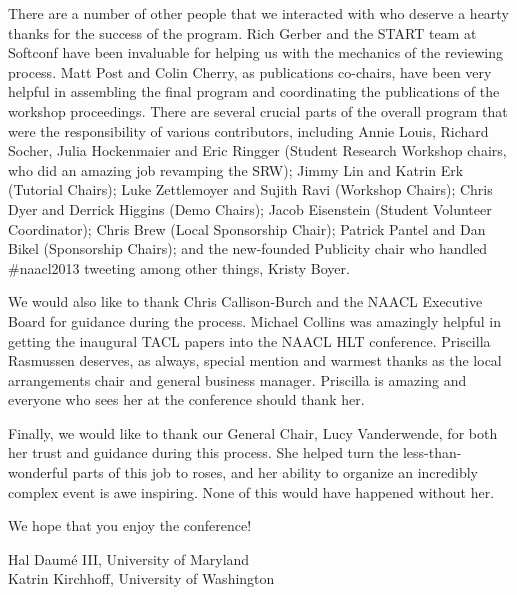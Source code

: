 There are a number of other people that we interacted with who deserve a hearty thanks for the success of the program. Rich Gerber and the START team at Softconf have been invaluable for helping us with the mechanics of the reviewing process. Matt Post and Colin Cherry, as publications co-chairs, have been very helpful in assembling the final program and coordinating the publications of the workshop proceedings. There are several crucial parts of the overall program that were the responsibility of various contributors, including Annie Louis, Richard Socher, Julia Hockenmaier and Eric Ringger (Student Research Workshop chairs, who did an amazing job revamping the SRW); Jimmy Lin and Katrin Erk (Tutorial Chairs); Luke Zettlemoyer and Sujith Ravi (Workshop Chairs); Chris Dyer and Derrick Higgins (Demo Chairs); Jacob Eisenstein (Student Volunteer Coordinator); Chris Brew (Local Sponsorship Chair); Patrick Pantel and Dan Bikel (Sponsorship Chairs); and the new-founded Publicity chair who handled \#naacl2013 tweeting among other things, Kristy Boyer.

We would also like to thank Chris Callison-Burch and the NAACL Executive Board for guidance during the process. Michael Collins was amazingly helpful in getting the inaugural TACL papers into the NAACL HLT conference. Priscilla Rasmussen deserves, as always, special mention and warmest thanks as the local arrangements chair and general business manager. Priscilla is amazing and everyone who sees her at the conference should thank her.

Finally, we would like to thank our General Chair, Lucy Vanderwende, for both her trust and guidance during this process. She helped turn the less-than-wonderful parts of this job to roses, and her ability to organize an incredibly complex event is awe inspiring. None of this would have happened without her.

We hope that you enjoy the conference!

Hal Daum\'{e} III, University of Maryland
\\Katrin Kirchhoff, University of Washington
